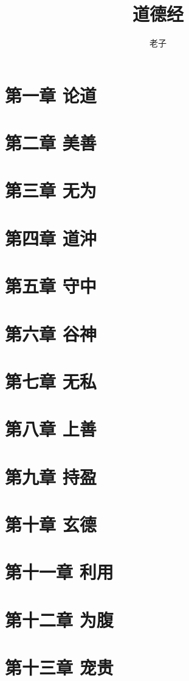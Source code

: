 \documentclass[UTF8]{ctexart}
\title{道德经}
\author{老子}
\date{}
\begin{document}
	\maketitle
	\thispagestyle{empty}
	
	\newpage
	\tableofcontents
	
	\newpage
	\setcounter{page}{1}
	\section{第一章 论道}
	\section{第二章 美善}
	\section{第三章 无为}
	\section{第四章 道沖}
	\section{第五章 守中}
	\section{第六章 谷神}
	\section{第七章 无私}
	\section{第八章 上善}
	\section{第九章 持盈}
	\section{第十章 玄德}
	\section{第十一章 利用}
	\section{第十二章 为腹}
	\section{第十三章 宠贵}
\end{document}
